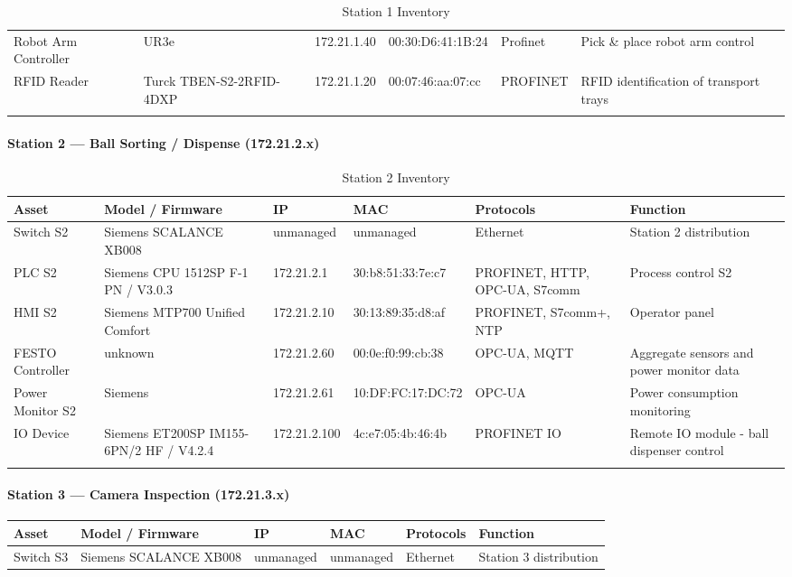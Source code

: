 \documentclass[11pt,a4paper]{article}
\begin{document}
{\begin{longtable}{L{2cm} L{2.1cm} L{2.1cm} L{2.6cm} L{2.4cm} L{4cm}}
    Robot Arm Controller & UR3e & 172.21.1.40 & 00:30:D6:41:1B:24 & Profinet & Pick
    \& place robot arm control \\ 

    RFID Reader & Turck TBEN-S2-2RFID-4DXP & 172.21.1.20 &
    00:07:46:aa:07:cc & PROFINET & RFID identification of transport trays \\
\bottomrule
    \caption{Station 1 Inventory}
\end{longtable}

\paragraph{Station 2 --- Ball Sorting / Dispense (172.21.2.x)}
\begin{longtable}{L{2cm} L{2.1cm} L{2.1cm} L{2.6cm} L{2.4cm} L{4cm}}
\toprule
\textbf{Asset} & \textbf{Model / Firmware} & \textbf{IP} & \textbf{MAC} & \textbf{Protocols} & \textbf{Function} \\
\midrule \endhead
    Switch S2 & Siemens SCALANCE XB008 & unmanaged & unmanaged & Ethernet &
    Station 2 distribution \\

    PLC S2 & Siemens CPU 1512SP F-1 PN / V3.0.3 & 172.21.2.1 & 30:b8:51:33:7e:c7 & PROFINET, HTTP, OPC-UA, S7comm & Process control S2 \\

    HMI S2 & Siemens MTP700 Unified Comfort & 172.21.2.10 & 30:13:89:35:d8:af &
    PROFINET, S7comm+, NTP & Operator panel \\

    FESTO Controller & unknown & 172.21.2.60 & 00:0e:f0:99:cb:38 & OPC-UA, MQTT & Aggregate sensors and power monitor data\\

    Power Monitor S2 & Siemens & 172.21.2.61 & 10:DF:FC:17:DC:72 & OPC-UA & Power
    consumption monitoring \\

    IO Device & Siemens ET200SP IM155-6PN/2 HF / V4.2.4 & 172.21.2.100 &
    4c:e7:05:4b:46:4b & PROFINET IO & Remote IO module - ball dispenser control \\
\bottomrule
    \caption{Station 2 Inventory}
\end{longtable}

\paragraph{Station 3 --- Camera Inspection (172.21.3.x)}
\begin{longtable}{L{2cm} L{2.1cm} L{2.1cm} L{2.6cm} L{2.4cm} L{4cm}}
\toprule
\textbf{Asset} & \textbf{Model / Firmware} & \textbf{IP} & \textbf{MAC} & \textbf{Protocols} & \textbf{Function} \\
\midrule \endhead
    Switch S3 & Siemens SCALANCE XB008 & unmanaged & unmanaged & Ethernet &
    Station 3 distribution \\


\end{longtable}}
\end{document}
